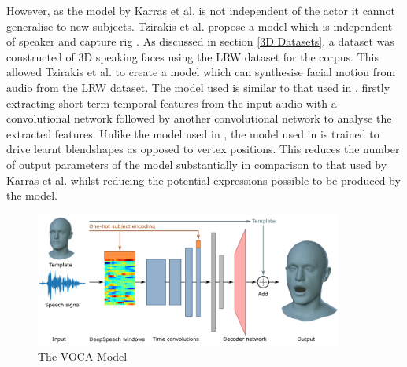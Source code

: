 However, as the model by Karras et al. is not independent of the actor it cannot generalise to new subjects.
Tzirakis et al. propose a model which is independent of speaker and capture rig \cite{Tzirakis2019}.
As discussed in section \ref{3D Datasets}, a dataset was constructed of 3D speaking faces using the LRW dataset \cite{Chung2016} for the corpus.
This allowed Tzirakis et al. to create a model which can synthesise facial motion from audio from the LRW dataset.
The model used is similar to that used in \cite{Karras2017a}, firstly extracting short term temporal features from the input audio with a convolutional network followed by another convolutional network to analyse the extracted features.
Unlike the model used in \cite{Karras2017a}, the model used in \cite{Tzirakis2019} is trained to drive learnt blendshapes as opposed to vertex positions.
This reduces the number of output parameters of the model substantially in comparison to that used by Karras et al. whilst reducing the potential expressions possible to be produced by the model.

\begin{figure}[h]
    \centering
        \includegraphics[width=0.9\textwidth]{figures/voca_model.png}
    \caption{The VOCA Model \cite{Cudeiro2019}}\label{fig:VOCA_model}
\end{figure}

